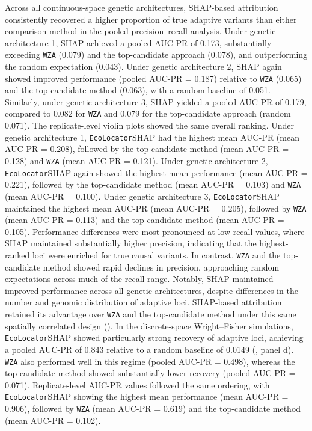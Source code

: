 \documentclass[]{article}
\newcommand{\ecolocator}{\texttt{EcoLocator}\xspace}
\begin{document}
Across all continuous-space genetic architectures,
SHAP-based attribution consistently recovered
a higher proportion of true adaptive variants
than either comparison method in the pooled precision--recall analysis.
Under genetic architecture 1,
SHAP achieved a pooled AUC-PR of 0.173, %
substantially exceeding \texttt{WZA} (0.079)
and the top-candidate approach (0.078),
and outperforming the random expectation (0.043).
Under genetic architecture 2,
SHAP again showed improved performance
(pooled AUC-PR = 0.187) %
relative to \texttt{WZA} (0.065)
and the top-candidate method (0.063),
with a random baseline of 0.051.
Similarly,
under genetic architecture 3,
SHAP yielded a pooled AUC-PR of 0.179, %
compared to 0.082 for \texttt{WZA}
and 0.079 for the top-candidate approach
(random = 0.071).
The replicate-level violin plots showed the same overall ranking.
Under genetic architecture 1, 
\ecolocator\texttimes{}SHAP had the highest mean AUC-PR
(mean AUC-PR = 0.208),
followed by the top-candidate method
(mean AUC-PR = 0.128)
and \texttt{WZA}
(mean AUC-PR = 0.121).
Under genetic architecture 2,
\ecolocator\texttimes{}SHAP again showed the highest mean performance
(mean AUC-PR = 0.221),
followed by the top-candidate method
(mean AUC-PR = 0.103)
and \texttt{WZA}
(mean AUC-PR = 0.100).
Under genetic architecture 3,
\ecolocator\texttimes{}SHAP maintained the highest mean AUC-PR
(mean AUC-PR = 0.205),
followed by \texttt{WZA}
(mean AUC-PR = 0.113)
and the top-candidate method
(mean AUC-PR = 0.105).
Performance differences were most pronounced
at low recall values,
where SHAP maintained substantially higher precision,
indicating that the highest-ranked loci
were enriched for true causal variants.
In contrast,
\texttt{WZA} and the top-candidate method showed rapid declines in precision,
approaching random expectations across much of the recall range.
Notably,
SHAP maintained improved performance
across all genetic architectures,
despite differences in the number
and genomic distribution of adaptive loci.
SHAP-based attribution retained its 
advantage over \texttt{WZA} and the top-candidate method under 
this same spatially correlated design ().
In the discrete-space Wright--Fisher simulations,
\ecolocator\texttimes{}SHAP showed particularly strong recovery
of adaptive loci,
achieving a pooled AUC-PR of 0.843 %
relative to a random baseline of 0.0149
(, panel d).
\texttt{WZA} also performed well in this regime
(pooled AUC-PR = 0.498),
whereas the top-candidate method showed substantially lower recovery
(pooled AUC-PR = 0.071).
Replicate-level AUC-PR values followed the same ordering,
with \ecolocator\texttimes{}SHAP showing the highest mean performance
(mean AUC-PR = 0.906),
followed by \texttt{WZA}
(mean AUC-PR = 0.619)
and the top-candidate method
(mean AUC-PR = 0.102).
\end{document}
